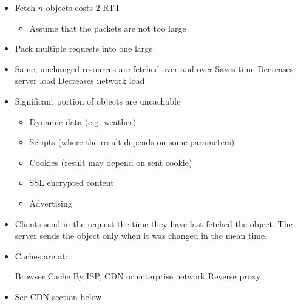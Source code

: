\begin{itemize}
\begin{itemize}
\begin{itemize}
                        \begin{itemize}
                            \item Fetch $n$ objects costs $2$ RTT
                                \begin{itemize}
                                    \item Assume that the packets are not too large
                                \end{itemize}
                            \item Pack multiple requests into one large
                        \end{itemize}
                \end{itemize}
                \begin{itemize}
                    \item Same, unchanged resources are fetched over and over
                    \ipro Saves time
                    \ipro Decreases server load
                    \ipro Decreases network load
                    \item Significant portion of objects are uncachable
                        \begin{itemize}
                            \item Dynamic data (e.g. weather)
                            \item Scripts (where the result depends on some parameters)
                            \item Cookies (result may depend on sent cookie)
                            \item SSL encrypted content
                            \item Advertising
                        \end{itemize}
                    \item Clients send in the request the time they have last fetched the object. The server sends the object only when it was changed in the mean time.
                    \item Caches are at:
                        \begin{itemize}
                             Browser Cache
                             By ISP, CDN or enterprise network
                             Reverse proxy
                        \end{itemize}
                \end{itemize}
                \begin{itemize}
                    \item See CDN section below
                \end{itemize}
        \end{itemize}
\end{itemize}

